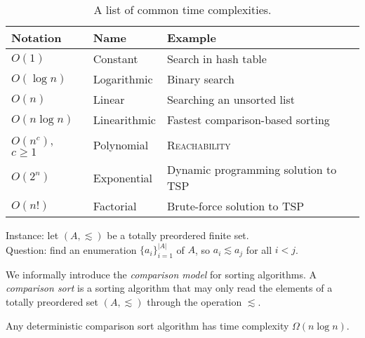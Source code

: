 \begin{table}
    \centering
    \caption{A list of common time complexities.}
    \label{tab:common-time-complexities}
    \begin{tabular}{lll}
        \toprule
        Notation             & Name         & Example                                      \\
        \midrule
        $O(1)$               & Constant     & Search in hash table                         \\
        $O(\log n)$          & Logarithmic  & Binary search                                \\
        $O(n)$               & Linear       & Searching an unsorted list                   \\
        $O(n\log n)$         & Linearithmic & Fastest comparison-based sorting             \\
        $O(n^c)$, $c \geq 1$ & Polynomial   & \textsc{Reachability}                        \\
        $O(2^n)$             & Exponential  & Dynamic programming solution to \textsc{TSP} \\
        $O(n!)$              & Factorial    & Brute-force solution to \textsc{TSP}         \\
        \bottomrule
    \end{tabular}
\end{table}

\begin{problem}[Sorting]
Instance: let $(A, \lesssim)$ be a totally preordered finite set. \\
Question: find an enumeration $\{a_i\}_{i=1}^{\lvert A \rvert}$ of $A$, so $a_i \lesssim a_j$ for all $i < j$.
\end{problem}

We informally introduce the \emph{comparison model} for sorting algorithms. A \emph{comparison sort} is a sorting algorithm that may only read the elements of a totally preordered set $(A, \lesssim)$ through the operation $\lesssim$.

\begin{theorem}
    Any deterministic comparison sort algorithm has time complexity $\Omega(n\log n)$.
\end{theorem}


